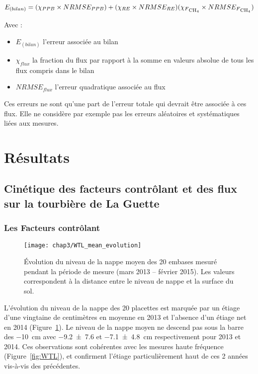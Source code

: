 \begin{equation}
E_{(bilan)} = (\chi_{PPB} \times NRMSE_{PPB}) + (\chi_{RE} \times NRMSE_{RE}) (\chi_{F\textsubscript{CH\textsubscript{4}}} \times NRMSE_{F\textsubscript{CH\textsubscript{4}}})
\end{equation}

Avec : 
\begin{itemize}
\item $E_{(bilan)}$ l'erreur associée au bilan
\item $\chi_{flux}$ la fraction du flux par rapport à la somme en valeurs absolue de tous les flux compris dans le bilan
\item $NRMSE_{flux}$ l'erreur quadratique associée au flux
\end{itemize}

Ces erreurs ne sont qu'une part de l'erreur totale qui devrait être associée à ces flux. Elle ne considère par exemple pas les erreurs aléatoires et systématiques liées aux mesures.


\section{Résultats}

\subsection{Cinétique des facteurs contrôlant et des flux sur la tourbière de La Guette}

\subsubsection{Les Facteurs contrôlant}

\begin{figure}
\centering
\texttt{[image: chap3/WTL\_mean\_evolution]}
\caption{Évolution du niveau de la nappe moyen des 20 embases mesuré pendant la période de mesure (mars 2013 -- février 2015). Les valeurs correspondent à la distance entre le niveau de nappe et la surface du sol.}
\label{fig:WTL_mean_evolution}
\end{figure}

L'évolution du niveau de la nappe des 20 placettes est marquée par un étiage d'une vingtaine de centimètres en moyenne en 2013 et l'absence d'un étiage net en 2014 (Figure~\ref{fig:WTL_mean_evolution}).
Le niveau de la nappe moyen ne descend pas sous la barre des \SI{-10}{\cm} avec \num{-9.2(76)} et \SI{-7.1(48)}{\centi\metre} respectivement pour 2013 et 2014.
Ces observations sont cohérentes avec les mesures haute fréquence (Figure~\ref{fig:WTL}), et confirment l'étiage particulièrement haut de ces 2 années vis-à-vis des précédentes.

